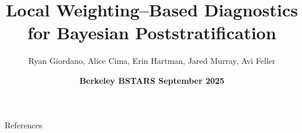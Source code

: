 \documentclass[8pt]{beamer}\usepackage[]{graphicx}\usepackage[]{color}
\title{Local Weighting--Based Diagnostics for Bayesian Poststratification}
\author{Ryan Giordano, Alice Cima, Erin Hartman, Jared Murray, Avi Feller}
\date{\textbf{Berkeley BSTARS September 2025}}
\begin{document}
\maketitle















\begin{frame}{References}

\renewcommand*{\bibfont}{\normalfont\tiny}


% 
% 

\printbibliography[heading=none]

\end{frame}
\end{document}
